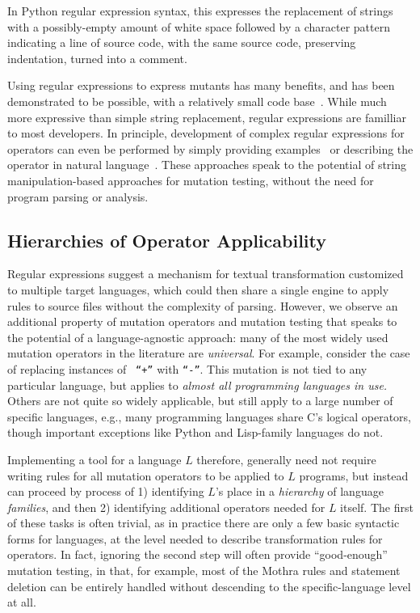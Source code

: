 \documentclass[sigconf,review, anonymous]{acmart}
\begin{document}
In Python regular expression syntax, this expresses the replacement of
strings with a possibly-empty amount of white space followed by a
character pattern indicating a line of source code, with the same
source code, preserving indentation, turned into a comment.

Using regular expressions to express mutants has many benefits, and
has been demonstrated to be possible, with a relatively small code base~\cite{regexpMut}.  While
much more expressive than simple string replacement, regular
expressions are familliar to most developers.  In principle,
development of complex regular expressions for operators can even be
performed by simply providing examples~\cite{bartoli2014automatic}  or
describing the operator in natural
language~\cite{zhong2018generating}.  
These approaches speak to the potential of string manipulation-based approaches
for mutation testing, without the need for program parsing or analysis. 


\subsection{Hierarchies of Operator Applicability}

Regular expressions suggest a mechanism for textual transformation customized to
multiple target languages, which could then share a single engine to apply rules
to source files without the complexity of parsing. 
However, we observe an additional property of mutation operators and mutation
testing that speaks to the potential of a language-agnostic approach: many of the
most widely used mutation operators in the literature are \emph{universal}.  For
example, consider the case of replacing instances of {\tt
  ``+''}  with {\tt ``-''}.  This mutation is not tied to any
particular language, but applies to \emph{almost all programming
  languages in use.}  Others are not quite
so widely applicable, but still apply to a large number of specific
languages, e.g., many programming languages share C's logical
operators, though important exceptions like Python and Lisp-family
languages do not.

Implementing a tool for a language $L$ therefore, generally need not
require writing rules for all mutation operators to be applied to $L$
programs, but instead can proceed by process of 1) identifying $L$'s
place in a \emph{hierarchy} of language \emph{families}, and then 2)
identifying additional operators needed for $L$ itself.  The first of
these tasks is often trivial, as in practice there are only a few
basic syntactic forms for languages, at the level needed to describe
transformation rules for operators.  In fact, ignoring the second step
will often provide ``good-enough'' mutation testing, in that, for
example, most of the Mothra rules and statement deletion can be
entirely handled without descending to the specific-language level at all.
\end{document}
